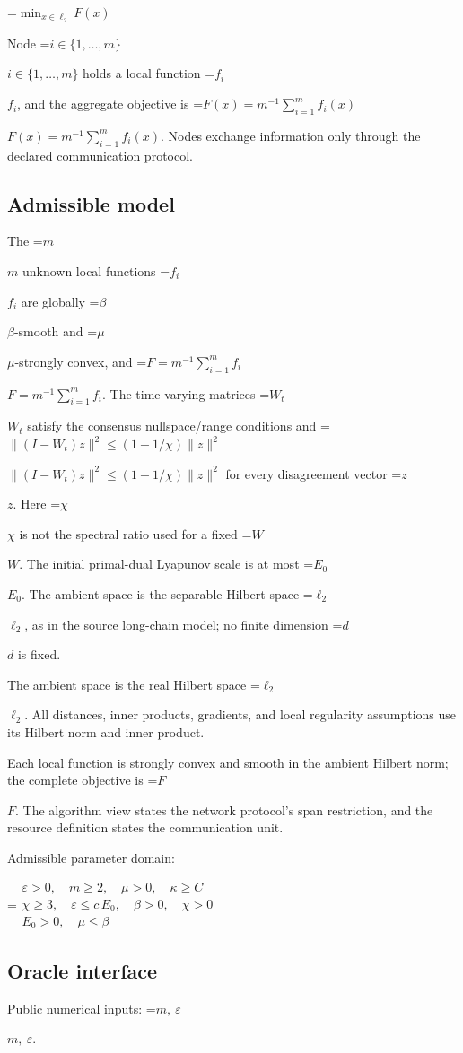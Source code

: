 \documentclass[10pt,a4paper]{article}
\newcommand{\AtlasMath}[1]{\par\begingroup\centering\setbox0=\hbox{$\displaystyle #1$}\ifdim\wd0>1.4\linewidth\typeout{ATLAS WIDE FORMULA: \the\wd0}\fi\ifdim\wd0>\linewidth\resizebox{\linewidth}{!}{\box0}\else\box0\fi\par\endgroup}
\newcommand{\AtlasInlineMath}[1]{\begingroup\setbox0=\hbox{$#1$}\ifdim\wd0>.4\linewidth\endgroup\AtlasMath{#1}\else\endgroup$#1$\fi}
\begin{document}
\AtlasMath{\min_{x\in \ell_2}F(x)}


Node \AtlasInlineMath{i\in\{1,\ldots,m\}} holds a local function \AtlasInlineMath{f_i}, and the aggregate objective is \AtlasInlineMath{F(x)=m^{-1}\sum_{i=1}^m f_i(x)}. Nodes exchange information only through the declared communication protocol.

\subsection{Admissible model}
The \AtlasInlineMath{m} unknown local functions \AtlasInlineMath{f_i} are globally \AtlasInlineMath{\beta}-smooth and \AtlasInlineMath{\mu}-strongly convex, and \AtlasInlineMath{F=m^{-1}\sum_{i=1}^m f_i}. The time-varying matrices \AtlasInlineMath{W_t} satisfy the consensus nullspace/range conditions and \AtlasInlineMath{\|(I-W_t)z\|^2\le(1-1/\chi)\|z\|^2} for every disagreement vector \AtlasInlineMath{z}. Here \AtlasInlineMath{\chi} is not the spectral ratio used for a fixed \AtlasInlineMath{W}. The initial primal-dual Lyapunov scale is at most \AtlasInlineMath{E_0}. The ambient space is the separable Hilbert space \AtlasInlineMath{\ell_2}, as in the source long-chain model; no finite dimension \AtlasInlineMath{d} is fixed.

The ambient space is the real Hilbert space \AtlasInlineMath{\ell_2}. All distances, inner products, gradients, and local regularity assumptions use its Hilbert norm and inner product.

Each local function is strongly convex and smooth in the ambient Hilbert norm; the complete objective is \AtlasInlineMath{F}. The algorithm view states the network protocol's span restriction, and the resource definition states the communication unit.

Admissible parameter domain:


\AtlasMath{\begin{gathered}\varepsilon > 0,\quad m \ge 2,\quad \mu > 0,\quad \kappa \ge C\\\chi \ge 3,\quad \varepsilon \le c\,E_0,\quad \beta > 0,\quad \chi > 0\\E_0 > 0,\quad \mu \le \beta\end{gathered}}


\subsection{Oracle interface}
Public numerical inputs: \AtlasInlineMath{m,\ \varepsilon}.
\end{document}
